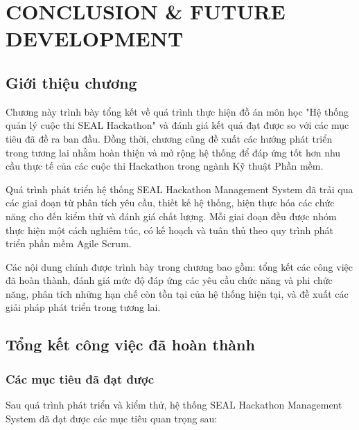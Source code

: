 \documentclass[12pt,a4paper]{report}
\begin{document}

\chapter{CONCLUSION \& FUTURE DEVELOPMENT}

\section{Giới thiệu chương}

Chương này trình bày tổng kết về quá trình thực hiện đồ án môn học "Hệ thống quản lý cuộc thi SEAL Hackathon" và đánh giá kết quả đạt được so với các mục tiêu đã đề ra ban đầu. Đồng thời, chương cũng đề xuất các hướng phát triển trong tương lai nhằm hoàn thiện và mở rộng hệ thống để đáp ứng tốt hơn nhu cầu thực tế của các cuộc thi Hackathon trong ngành Kỹ thuật Phần mềm.

Quá trình phát triển hệ thống SEAL Hackathon Management System đã trải qua các giai đoạn từ phân tích yêu cầu, thiết kế hệ thống, hiện thực hóa các chức năng cho đến kiểm thử và đánh giá chất lượng. Mỗi giai đoạn đều được nhóm thực hiện một cách nghiêm túc, có kế hoạch và tuân thủ theo quy trình phát triển phần mềm Agile Scrum.

Các nội dung chính được trình bày trong chương bao gồm: tổng kết các công việc đã hoàn thành, đánh giá mức độ đáp ứng các yêu cầu chức năng và phi chức năng, phân tích những hạn chế còn tồn tại của hệ thống hiện tại, và đề xuất các giải pháp phát triển trong tương lai.


\section{Tổng kết công việc đã hoàn thành}

\subsection{Các mục tiêu đã đạt được}

Sau quá trình phát triển và kiểm thử, hệ thống SEAL Hackathon Management System đã đạt được các mục tiêu quan trọng sau:
\end{document}
